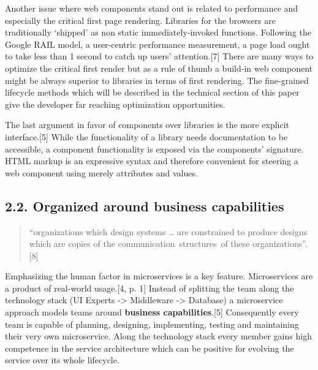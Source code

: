 \documentclass[]{article}
\begin{document}
Another issue where web components stand out is related to performance
and especially the critical first page rendering. Libraries for the
browsers are traditionally `shipped' as non static immediately-invoked
functions. Following the Google RAIL model, a user-centric performance
measurement, a page load ought to take less than 1 second to catch up
users' attention.{[}7{]} There are many ways to optimize the critical
first render but as a rule of thumb a build-in web component might be
always superior to libraries in terms of first rendering. The
fine-grained lifecycle methods which will be described in the technical
section of this paper give the developer far reaching optimization
opportunities.

The last argument in favor of components over libraries is the more
explicit interface.{[}5{]} While the functionality of a library needs
documentation to be accessible, a component functionality is exposed via
the components' signature. HTML markup is an expressive syntax and
therefore convenient for steering a web component using merely
attributes and values.

\subsection{2.2. Organized around business
capabilities}\label{organized-around-business-capabilities}

\begin{quote}
``organizations which design systems \ldots{} are constrained to produce
designs which are copies of the communication~structures~of these
organizations''. {[}8{]}
\end{quote}

Emphasizing the human factor in microservices is a key feature.
Microservices are a product of real-world usage.{[}4, p. 1{]} Instead of
splitting the team along the technology stack (UI Experts
-\textgreater{} Middleware -\textgreater{} Database) a microservice
approach models teams around \textbf{business capabilities}.{[}5{]}
Consequently every team is capable of planning, designing, implementing,
testing and maintaining their very own microservice. Along the
technology stack every member gains high competence in the service
architecture which can be positive for evolving the service over its
whole lifecycle.
\end{document}
